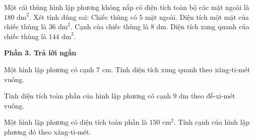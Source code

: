 \begin{ex} %
Một cái thùng hình lập phương không nắp có diện tích toàn bộ các mặt ngoài là $180\text{ dm}^2$. Xét tính đúng sai:
\choiceTF
{\True Chiếc thùng có $5$ mặt ngoài.}
{\True Diện tích một mặt của chiếc thùng là $36\text{ dm}^2$.}
{Cạnh của chiếc thùng là $8\text{ dm}$.}
{\True Diện tích xung quanh của chiếc thùng là $144\text{ dm}^2$.}
\end{ex}

\textbf{Phần 3. Trả lời ngắn}

\begin{ex} %
Một hình lập phương có cạnh $7\text{ cm}$. Tính diện tích xung quanh theo xăng-ti-mét vuông.
\end{ex}

\begin{ex} %
Tính diện tích toàn phần của hình lập phương có cạnh $9\text{ dm}$ theo đề-xi-mét vuông.
\end{ex}

\begin{ex} %
Một hình lập phương có diện tích toàn phần là $150\text{ cm}^2$. Tính cạnh của hình lập phương đó theo xăng-ti-mét.
\end{ex}

